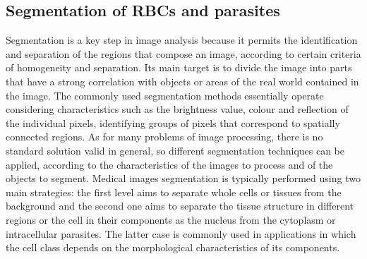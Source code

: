\documentclass[sensors,review,submit,moreauthors,pdftex,10pt,a4paper]{mdpi}
\begin{document}

\subsection{Segmentation of RBCs and parasites}
Segmentation is a key step in image analysis because it permits the identification and separation of the regions that compose an image, according to certain criteria of homogeneity and separation. Its main target is to divide the image into parts that have a strong correlation with objects or areas of the real world contained in the image.
The commonly used segmentation methods essentially operate considering characteristics such as the brightness value, colour and reflection of the individual pixels, identifying groups of pixels that correspond to spatially connected regions. As for many problems of image processing, there is no standard solution valid in general, so different segmentation techniques can be applied, according to the characteristics of the images to process and of the objects to segment.
Medical images segmentation is typically performed using two main strategies: the first level aims to separate whole cells or tissues from the background and the second one aims to separate the tissue structure in different regions or the cell in their components as the nucleus from the cytoplasm or intracellular parasites. The latter case is commonly used in applications in which the cell class depends on the morphological characteristics of its components.
\end{document}
